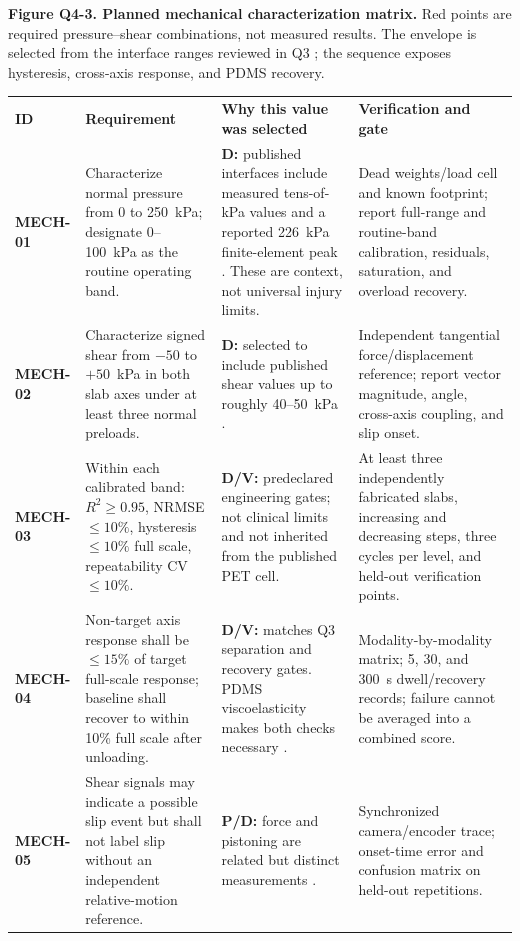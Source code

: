 {\fontsize{7.4}{8.55}\selectfont\color{AUBGray}
\textbf{Figure Q4-3. Planned mechanical characterization matrix.} Red points
are required pressure--shear combinations, not measured results. The envelope
is selected from the interface ranges reviewed in Q3
\cite{q3sanders1992,q3tang2022,q3zhang2001}; the sequence exposes hysteresis,
cross-axis response, and PDMS recovery.\par}

\vspace{0.5em}
\begingroup
\fontsize{8.2}{9.6}\selectfont
\setlength{\tabcolsep}{3pt}\renewcommand{\arraystretch}{1.11}
\begin{tabularx}{\linewidth}{>{\raggedright\arraybackslash\bfseries\color{AUBRed}}p{1.25cm}Y Y Y}
\color{white}\textbf{ID} & \color{white}\textbf{Requirement} &
\color{white}\textbf{Why this value was selected} & \color{white}\textbf{Verification and gate} \\
MECH-01 & Characterize normal pressure from 0 to 250~kPa; designate 0--100~kPa
as the routine operating band. & \textbf{D:} published interfaces include
measured tens-of-kPa values and a reported 226~kPa finite-element peak
\cite{q3sanders1992,q3tang2022,q3zhang2001}. These are context, not universal
injury limits. & Dead weights/load cell and known footprint; report full-range
and routine-band calibration, residuals, saturation, and overload recovery. \\
MECH-02 & Characterize signed shear from $-50$ to $+50$~kPa in both slab axes
under at least three normal preloads. & \textbf{D:} selected to include
published shear values up to roughly 40--50~kPa
\cite{q3sanders1992,q3zhang2001}. & Independent tangential force/displacement
reference; report vector magnitude, angle, cross-axis coupling, and slip onset. \\
MECH-03 & Within each calibrated band: $R^2\geq0.95$, NRMSE $\leq10\%$,
hysteresis $\leq10\%$ full scale, repeatability CV $\leq10\%$. & \textbf{D/V:}
predeclared engineering gates; not clinical limits and not inherited from the
published PET cell. & At least three independently fabricated slabs, increasing
and decreasing steps, three cycles per level, and held-out verification points. \\
MECH-04 & Non-target axis response shall be $\leq15\%$ of target full-scale
response; baseline shall recover to within 10\% full scale after unloading. &
\textbf{D/V:} matches Q3 separation and recovery gates. PDMS viscoelasticity
makes both checks necessary \cite{albrecht2019}. & Modality-by-modality matrix;
5, 30, and 300~s dwell/recovery records; failure cannot be averaged into a
combined score. \\
MECH-05 & Shear signals may indicate a possible slip event but shall not label
slip without an independent relative-motion reference. & \textbf{P/D:} force
and pistoning are related but distinct measurements \cite{q3tang2022,noll2018}. &
Synchronized camera/encoder trace; onset-time error and confusion matrix on
held-out repetitions. \\
\end{tabularx}
